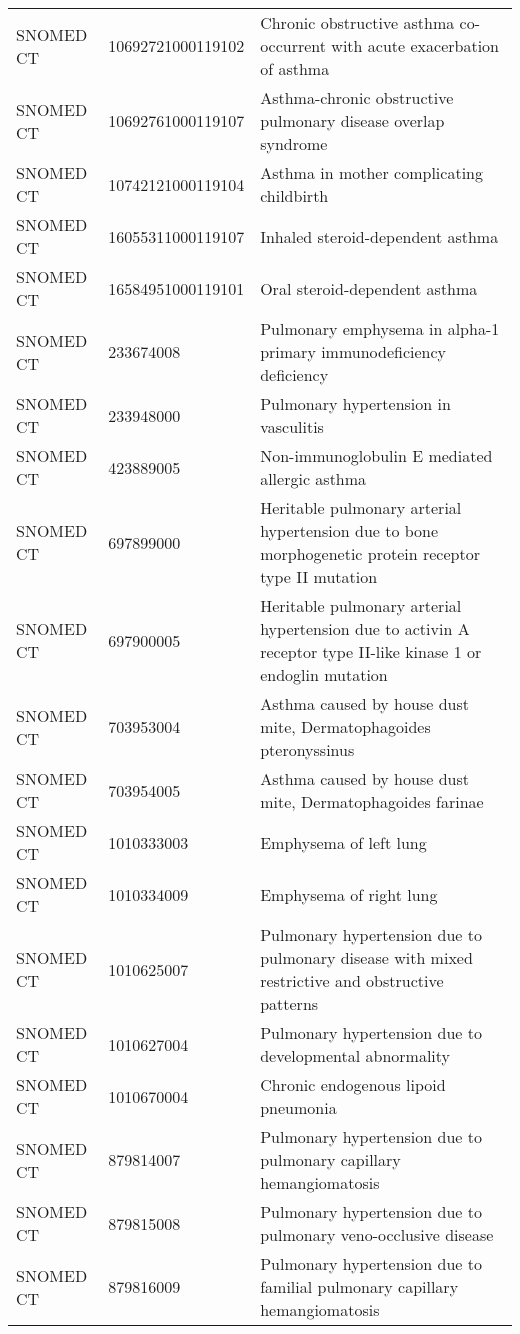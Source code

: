 \begin{table}[ht]
\begin{tabular}{lll}
  SNOMED CT & 10692721000119102 & Chronic obstructive asthma co-occurrent with acute exacerbation of asthma \\ 
  SNOMED CT & 10692761000119107 & Asthma-chronic obstructive pulmonary disease overlap syndrome \\ 
  SNOMED CT & 10742121000119104 & Asthma in mother complicating childbirth \\ 
  SNOMED CT & 16055311000119107 & Inhaled steroid-dependent asthma \\ 
  SNOMED CT & 16584951000119101 & Oral steroid-dependent asthma \\ 
  SNOMED CT & 233674008 & Pulmonary emphysema in alpha-1 primary immunodeficiency deficiency \\ 
  SNOMED CT & 233948000 & Pulmonary hypertension in vasculitis \\ 
  SNOMED CT & 423889005 & Non-immunoglobulin E mediated allergic asthma \\ 
  SNOMED CT & 697899000 & Heritable pulmonary arterial hypertension due to bone morphogenetic protein receptor type II mutation \\ 
  SNOMED CT & 697900005 & Heritable pulmonary arterial hypertension due to activin A receptor type II-like kinase 1 or endoglin mutation \\ 
  SNOMED CT & 703953004 & Asthma caused by house dust mite, Dermatophagoides pteronyssinus \\ 
  SNOMED CT & 703954005 & Asthma caused by house dust mite, Dermatophagoides farinae \\ 
  SNOMED CT & 1010333003 & Emphysema of left lung \\ 
  SNOMED CT & 1010334009 & Emphysema of right lung \\ 
  SNOMED CT & 1010625007 & Pulmonary hypertension due to pulmonary disease with mixed restrictive and obstructive patterns \\ 
  SNOMED CT & 1010627004 & Pulmonary hypertension due to developmental abnormality \\ 
  SNOMED CT & 1010670004 & Chronic endogenous lipoid pneumonia \\ 
  SNOMED CT & 879814007 & Pulmonary hypertension due to pulmonary capillary hemangiomatosis \\ 
  SNOMED CT & 879815008 & Pulmonary hypertension due to pulmonary veno-occlusive disease \\ 
  SNOMED CT & 879816009 & Pulmonary hypertension due to familial pulmonary capillary hemangiomatosis \\ 

\end{tabular}
\end{table}
